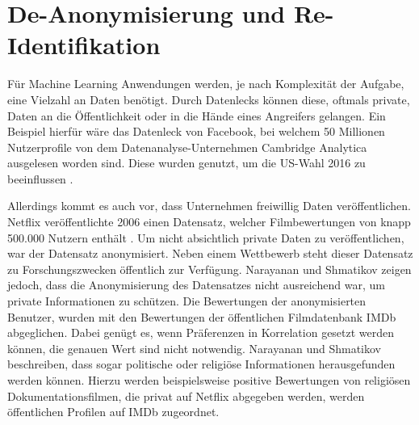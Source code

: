 \section{De-Anonymisierung und Re-Identifikation}

Für Machine Learning Anwendungen werden, je nach Komplexität der Aufgabe, eine Vielzahl an Daten benötigt.
Durch Datenlecks können diese, oftmals private, Daten an die Öffentlichkeit oder in die Hände eines Angreifers gelangen.
Ein Beispiel hierfür wäre das Datenleck von Facebook, bei welchem 50 Millionen Nutzerprofile von dem Datenanalyse-Unternehmen Cambridge Analytica ausgelesen worden sind. 
Diese wurden genutzt, um die US-Wahl 2016 zu beeinflussen \cite{I-2}.

Allerdings kommt es auch vor, dass Unternehmen freiwillig Daten veröffentlichen. 
Netflix veröffentlichte 2006 einen Datensatz, welcher Filmbewertungen von knapp 500.000 Nutzern enthält \cite{I-3}. 
Um nicht absichtlich private Daten zu veröffentlichen, war der Datensatz anonymisiert.
Neben einem Wettbewerb steht dieser Datensatz zu Forschungszwecken öffentlich zur Verfügung.
Narayanan und Shmatikov \cite{P-29} zeigen jedoch, dass die Anonymisierung des Datensatzes nicht ausreichend war, um private Informationen zu schützen.
Die Bewertungen der anonymisierten Benutzer, wurden mit den Bewertungen der öffentlichen Filmdatenbank IMDb abgeglichen.
Dabei genügt es, wenn Präferenzen in Korrelation gesetzt werden können, die genauen Wert sind nicht notwendig.
Narayanan und Shmatikov \cite{P-29} beschreiben, dass sogar politische oder religiöse Informationen herausgefunden werden können.
Hierzu werden beispielsweise positive Bewertungen von religiösen Dokumentationsfilmen, die privat auf Netflix abgegeben werden, werden öffentlichen Profilen auf IMDb zugeordnet.
